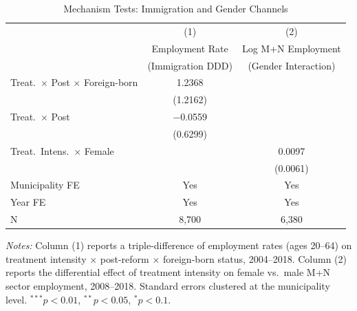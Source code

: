 \begin{table}[htbp]
\centering
\caption{Mechanism Tests: Immigration and Gender Channels}
\label{tab:mechanisms}
\begin{tabular}{lcc}
\hline\hline
 & (1) & (2) \\
 & Employment Rate & Log M+N Employment \\
 & (Immigration DDD) & (Gender Interaction) \\
\hline
Treat.\ $\times$ Post $\times$ Foreign-born & 1.2368 & \\
 & (1.2162) & \\
Treat.\ $\times$ Post & $-$0.0559 & \\
 & (0.6299) & \\
Treat.\ Intens.\ $\times$ Female & & 0.0097 \\
 & & (0.0061) \\
\hline
Municipality FE & Yes & Yes \\
Year FE & Yes & Yes \\
N & 8,700 & 6,380 \\
\hline\hline
\end{tabular}
\begin{minipage}{0.95\textwidth}
\vspace{0.3em}\footnotesize
\textit{Notes:} Column (1) reports a triple-difference of employment rates (ages 20--64) on treatment intensity $\times$ post-reform $\times$ foreign-born status, 2004--2018. Column (2) reports the differential effect of treatment intensity on female vs.\ male M+N sector employment, 2008--2018. Standard errors clustered at the municipality level. $^{***}p<0.01$, $^{**}p<0.05$, $^{*}p<0.1$.
\end{minipage}
\end{table}

